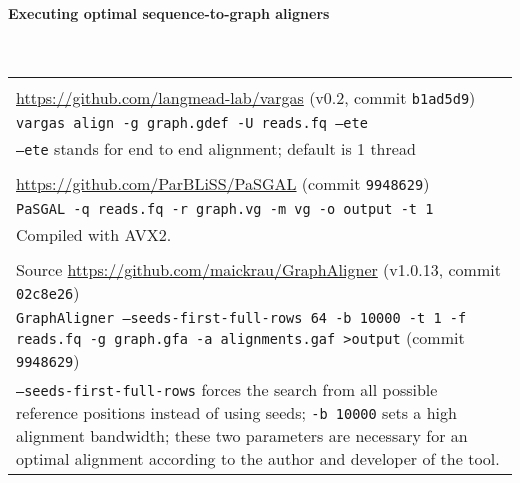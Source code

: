 \paragraph{Executing optimal sequence-to-graph aligners}\mbox{}\\
\begin{tabular}{p}
	\textbf{\vargas} \\
	\url{https://github.com/langmead-lab/vargas} (v0.2, commit \texttt{b1ad5d9}) \\
	\texttt{vargas align -g graph.gdef -U reads.fq --ete} \\
	\texttt{--ete} stands for end to end alignment; default is 1 thread \\
	\textbf{\pasgal} \\
	\url{https://github.com/ParBLiSS/PaSGAL} (commit \texttt{9948629}) \\	
	\texttt{PaSGAL -q reads.fq -r graph.vg -m vg -o output -t 1} \\
	Compiled with AVX2.\\
	\textbf{\graphaligner} \\
	\quad Source
	\url{https://github.com/maickrau/GraphAligner}
	(v1.0.13, commit \texttt{02c8e26}) \\
	\texttt{GraphAligner --seeds-first-full-rows 64 -b 10000 -t 1 -f reads.fq -g graph.gfa -a alignments.gaf >output} (commit \texttt{9948629})\\
	\texttt{--seeds-first-full-rows} forces the search from all
	possible reference positions instead of using seeds; \texttt{-b 10000} sets
	a high alignment bandwidth; these two parameters are necessary for an
	optimal alignment according to the author and developer of the tool.\\
\end{tabular}\\

